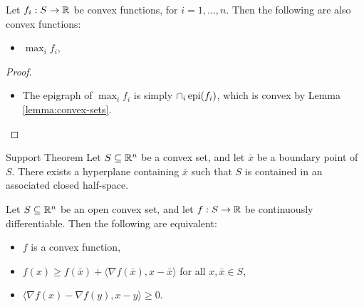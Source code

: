 \begin{lemma}
    Let $f_i: S \to \mathbb{R}$ be convex functions, for $i = 1, \ldots, n$. Then the following are also convex functions:
    \begin{itemize}
        \item $\max_{i}f_i$,
    \end{itemize}
\end{lemma}

\begin{proof}\proofbreak
    \begin{itemize}
        \item The epigraph of $\max_{i}f_i$ is simply $\cap_{i}\operatorname{epi}(f_i)$, which is convex by Lemma \ref{lemma:convex-sets}.
    \end{itemize}
\end{proof}

\begin{thm}{Support Theorem}\label{support-theorem}\proofbreak
    Let $S \subseteq \mathbb{R}^n$ be a convex set, and let $\bar{x}$ be a boundary point of $S$. There exists a hyperplane containing $\bar{x}$ such that $S$ is contained in an associated closed half-space.
\end{thm}

\begin{thm}\label{convex-function-tangent-hyperplane}
    Let $S \subseteq \mathbb{R}^n$ be an open convex set, and let $f: S \to \mathbb{R}$ be continuously differentiable. Then the following are equivalent:
    \begin{itemize}
        \item $f$ is a convex function,
        \item $f(x) \geq f(\bar{x}) + \langle \nabla f(\bar{x}), x - \bar{x}\rangle$ for all $x, \bar{x} \in S$,
        \item $\langle  \nabla f(x) - \nabla f(y), x - y \rangle \geq 0$.
    \end{itemize}
\end{thm}

